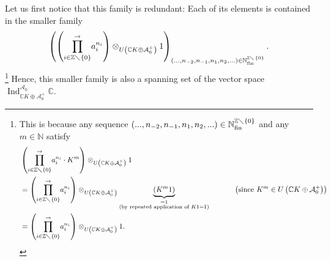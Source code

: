 \documentclass[etingof-lie.tex]{subfiles}
\begin{document}
Let us first notice that this family is redundant: Each of its elements is
contained in the smaller family%
\[
\left(  \left(  \overset{\rightarrow}{\prod\limits_{i\in\mathbb{Z}%
\diagdown\left\{  0\right\}  }}a_{i}^{n_{i}}\right)  \otimes_{U\left(
\mathbb{C}K\oplus\mathcal{A}_{0}^{+}\right)  }1\right)  _{\left(
...,n_{-2},n_{-1},n_{1},n_{2},...\right)  \in\mathbb{N}_{\operatorname*{fin}%
}^{\mathbb{Z}\diagdown\left\{  0\right\}  }}.
\]
\footnote{This is because any sequence $\left(  ...,n_{-2},n_{-1},n_{1}%
,n_{2},...\right)  \in\mathbb{N}_{\operatorname*{fin}}^{\mathbb{Z}%
\diagdown\left\{  0\right\}  }$ and any $m\in\mathbb{N}$ satisfy%
\begin{align*}
&  \left(  \overset{\rightarrow}{\prod\limits_{i\in\mathbb{Z}\diagdown\left\{
0\right\}  }}a_{i}^{n_{i}}\cdot K^{m}\right)  \otimes_{U\left(  \mathbb{C}%
K\oplus\mathcal{A}_{0}^{+}\right)  }1\\
&  =\left(  \overset{\rightarrow}{\prod\limits_{i\in\mathbb{Z}\diagdown
\left\{  0\right\}  }}a_{i}^{n_{i}}\right)  \otimes_{U\left(  \mathbb{C}%
K\oplus\mathcal{A}_{0}^{+}\right)  }\underbrace{\left(  K^{m}1\right)
}_{\substack{=1\\\text{(by repeated application of }K1=1\text{)}%
}}\ \ \ \ \ \ \ \ \ \ \left(  \text{since }K^{m}\in U\left(  \mathbb{C}%
K\oplus\mathcal{A}_{0}^{+}\right)  \right) \\
&  =\left(  \overset{\rightarrow}{\prod\limits_{i\in\mathbb{Z}\diagdown
\left\{  0\right\}  }}a_{i}^{n_{i}}\right)  \otimes_{U\left(  \mathbb{C}%
K\oplus\mathcal{A}_{0}^{+}\right)  }1.
\end{align*}
} Hence, this smaller family is also a spanning set of the vector space
$\operatorname*{Ind}\nolimits_{\mathbb{C}K\oplus\mathcal{A}_{0}^{+}%
}^{\mathcal{A}_{0}}\mathbb{C}$.
\end{document}
